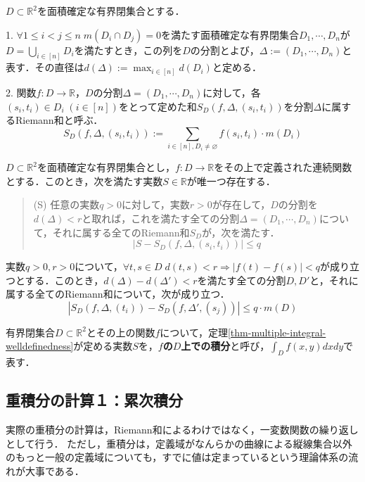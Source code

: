 \documentclass[uplatex, dvipdfmx]{jsreport}
\begin{document}
\begin{definition}
    $D\subset\mathbb{R}^2$を面積確定な有界閉集合とする．

    1. $\forall 1\le i<j\le n\; m(D_i\cap D_j)=0$を満たす面積確定な有界閉集合$D_1,\cdots,D_n$が$D=\bigcup_{i\in [n]}D_i$を満たすとき，この列を$D$の分割とよび，$\Delta:=(D_1,\cdots,D_n)$と表す．その直径は$d(\Delta):=\max_{i\in [n]}d(D_i)$と定める．

    2. 関数$f:D\to\mathbb{R}$，$D$の分割$\Delta=(D_1,\cdots,D_n)$に対して，各$(s_i,t_i)\in D_i\; (i\in [n])$をとって定めた和$S_D(f,\Delta,(s_i,t_i))$を分割$\Delta$に属するRiemann和と呼ぶ．
    \[ S_D(f,\Delta,(s_i,t_i)) := \sum_{i\in [n],D_i\ne\varnothing}f(s_i,t_i)\cdot m(D_i) \]
\end{definition}

\begin{theorem}\label{thm-multiple-integral-welldefinedness}
    $D\subset\mathbb{R}^2$を面積確定な有界閉集合とし，$f:D\to\mathbb{R}$をその上で定義された連続関数とする．このとき，次を満たす実数$S\in\mathbb{R}$が唯一つ存在する．
    \begin{quotation}
        (S) 任意の実数$q>0$に対して，実数$r>0$が存在して，$D$の分割を$d(\Delta)<r$と取れば，これを満たす全ての分割$\Delta=(D_1,\cdots,D_n)$について，それに属する全てのRiemann和$S_D$が，次を満たす．
        \[ |S- S_D(f,\Delta,(s_i,t_i)) |\le q \]
    \end{quotation}
\end{theorem}

\begin{lemma}[Riemann和の差の評価]
    実数$q>0,r>0$について，$\forall t,s\in D\; d(t,s)<r\Rightarrow |f(t)-f(s)|<q$が成り立つとする．このとき，$d(\Delta)-d(\Delta')<r$を満たす全ての分割$D,D'$と，それに属する全てのRiemann和について，次が成り立つ．
    \[ |S_D (f,\Delta,(t_i)) - S_D(f,\Delta',(s_j)) |\le q\cdot m(D) \]
\end{lemma}

\begin{definition}
    有界閉集合$D\subset\mathbb{R}^2$とその上の関数$f$について，定理\ref{thm-multiple-integral-welldefinedness}が定める実数$S$を，\textbf{$f$の$D$上での積分}と呼び，$\int_Df(x,y)dxdy$で表す．
\end{definition}

\subsection{重積分の計算１：累次積分}
実際の重積分の計算は，Riemann和によるわけではなく，一変数関数の繰り返しとして行う．
ただし，重積分は，定義域がなんらかの曲線による縦線集合以外のもっと一般の定義域についても，すでに値は定まっているという理論体系の流れが大事である．
\end{document}
